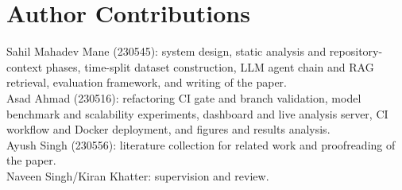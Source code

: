\documentclass[12pt,onecolumn,draftclsnofoot]{IEEEtran}
\begin{document}
\section*{Author Contributions}

\noindent Sahil Mahadev Mane (230545): system design, static analysis and repository-context phases, time-split dataset construction, LLM agent chain and RAG retrieval, evaluation framework, and writing of the paper.\\
Asad Ahmad (230516): refactoring CI gate and branch validation, model benchmark and scalability experiments, dashboard and live analysis server, CI workflow and Docker deployment, and figures and results analysis.\\
Ayush Singh (230556): literature collection for related work and proofreading of the paper.\\
Naveen Singh/Kiran Khatter: supervision and review.



\end{document}
